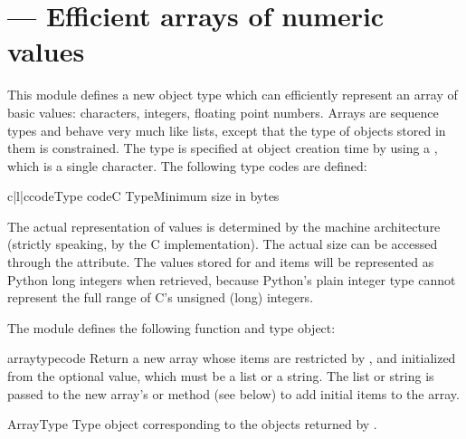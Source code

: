 \section{ ---
         Efficient arrays of numeric values}



This module defines a new object type which can efficiently represent
an array of basic values: characters, integers, floating point
numbers.  Arrays are sequence types and behave very much
like lists, except that the type of objects stored in them is
constrained.  The type is specified at object creation time by using a
, which is a single character.  The following type
codes are defined:

\begin{tableiii}{c|l|c}{code}{Type code}{C Type}{Minimum size in bytes}
\end{tableiii}

The actual representation of values is determined by the machine
architecture (strictly speaking, by the C implementation).  The actual
size can be accessed through the  attribute.  The values
stored  for  and  items will be represented as
Python long integers when retrieved, because Python's plain integer
type cannot represent the full range of C's unsigned (long) integers.


The module defines the following function and type object:

\begin{funcdesc}{array}{typecode}
Return a new array whose items are restricted by , and
initialized from the optional  value, which must be a
list or a string.  The list or string is passed to the new array's
 or  method (see below) to add
initial items to the array.
\end{funcdesc}

\begin{datadesc}{ArrayType}
Type object corresponding to the objects returned by
.
\end{datadesc}


